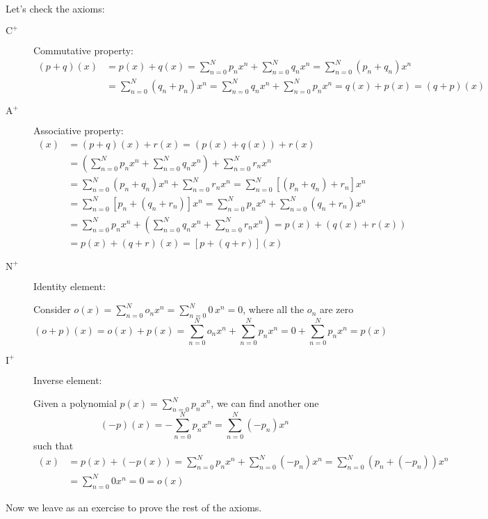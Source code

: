 Let's check the axioms:
\begin{description}
\item[$\text{C}^+$] Commutative property:
  \begin{align*}
    (p + q)(x) &= p(x) + q(x) = \sum_{n=0}^N p_n x^n + \sum_{n=0}^N q_n x^n
                 = \sum_{n=0}^N (p_n + q_n) x^n\\
               &= \sum_{n=0}^N (q_n + p_n) x^n
      = \sum_{n=0}^N q_n x^n + \sum_{n=0}^N p_n x^n = q(x) + p(x)
        = (q + p)(x)
  \end{align*}
\item[$\text{A}^+$] Associative property:
  \begin{align*}
    [(p + q) + r](x)
    &= (p + q)(x) + r(x)
      =(p(x) + q(x)) + r(x)\\
    &= \left(\sum_{n=0}^N p_n x^n + \sum_{n=0}^N q_n x^n\right) + \sum_{n=0}^N r_n x^n\\
    &= \sum_{n=0}^N (p_n + q_n) x^n + \sum_{n=0}^N r_n x^n
      = \sum_{n=0}^N [(p_n + q_n) + r_n] x^n\\
    &= \sum_{n=0}^N [p_n + (q_n + r_n)] x^n
    = \sum_{n=0}^N p_n x^n + \sum_{n=0}^N (q_n + r_n) x^n\\
    &= \sum_{n=0}^N p_n x^n + \left(\sum_{n=0}^N q_n x^n + \sum_{n=0}^N r_n x^n\right)
      = p(x) + (q(x) + r(x))\\
    &= p(x) + (q + r)(x)
    = [p + (q + r)](x)
  \end{align*}
\item[$\text{N}^+$] Identity element:
  
  Consider $o(x) = \sum_{n=0}^N o_n x^n = \sum_{n=0}^N 0\, x^n = 0$, where all the $o_n$ are zero
  \[
    (o + p)(x) = o(x) + p(x) = \sum_{n=0}^N o_n x^n + \sum_{n=0}^N p_n x^n
    = 0 + \sum_{n=0}^N p_n x^n = p(x)
  \]
\item[$\text{I}^+$] Inverse element:
  
  Given a polynomial $p(x) = \sum_{n=0}^N p_n x^n$, we can find another one
  \[
    (-p)(x) = -\sum_{n=0}^N p_n x^n = \sum_{n=0}^N (-p_n) x^n
  \]
  such that
  \begin{align*}
    [p + (-p)](x) &= p(x) + (-p(x)) = \sum_{n=0}^N p_n x^n + \sum_{n=0}^N (-p_n) x^n
               = \sum_{n=0}^N (p_n + (-p_n)) x^n\\
             &=\sum_{n=0}^N 0 x^n = 0 = o(x)
  \end{align*}
\end{description}
Now we leave as an exercise to prove the rest of the axioms.



